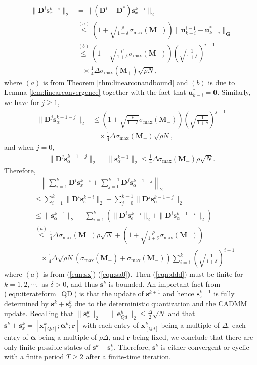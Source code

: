 \documentclass[journal]{IEEEtran}
\newcommand{\nn}{\nonumber}
\begin{document}
\begin{IEEEproof}
\begin{align}
\label{eqn:sx}
\|\bm D^i \bm s_x^{k-i}\|_2 &= \|(\bm D^{i} -\bm D^*)\bm s_x^{k-i}\|_2\nn\\
&\stackrel{(a)}{\leq}\left(1+\sqrt{\frac{\rho}{1+\delta}}\sigma_{\max}(\bm M_-)\right)\|\bm u_{k-i}^{i-1}-\bm u_{k-i}^*\|_{\bm G}\nn\\
&\stackrel{(b)}{\leq}\left(1+\sqrt{\frac{\rho}{1+\delta}}\sigma_{\max}(\bm M_-)\right) \left(\sqrt{\frac{1}{1+\delta}}\right)^{i-1}\nn\\&~~~~\times\frac{1}{4}\Delta\sigma_{\max}(\bm M_+)\sqrt{\rho N},
\end{align}
where $(a)$ is from Theorem \ref{thm:linearconandbound} and $(b)$ is due to Lemma \ref{lem:linearconvergence} together with the fact that $\bm u_{k-i}^*=\bm 0$. Similarly, we have for $j\geq 1$,
\begin{align}
\label{eqn:sa}
\|\bm D^j \bm s_\alpha^{k-1-j}\|_2 &\leq \left(1+\sqrt{\frac{\rho}{1+\delta}}\sigma_{\max}(\bm M_-)\right) \left(\sqrt{\frac{1}{1+\delta}}\right)^{j-1}\nn\\&~~~~\times\frac{1}{4}\Delta\sigma_{\max}(\bm M_-)\sqrt{{\rho}N},
\end{align}
and when $j=0$, 
\begin{align}
\label{eqn:sa0}
\|\bm D^j \bm s_\alpha^{k-1-j}\|_2=\|\bm s_\alpha^{k-1}\|_2\leq \frac{1}{4}\Delta\sigma_{\max}(\bm M_-)\rho\sqrt{N}.
\end{align} 
Therefore, 
\begin{align}
&~~~~\left\|\sum_{i=1}^{k} \bm D^i \bm s_x^{k-i}+\sum_{j=0}^{k-1} \bm D^j\bm s_\alpha^{k-1-j}\right\|_2\nn\\
&\leq \sum_{i=1}^{k} \|\bm D^i \bm s_e^{k-i}\|_2+\sum_{j=0}^{k-1} \|\bm D^j\bm s_\alpha^{k-1-j}\|_2\nn\\
&\leq \|\bm s_\alpha^{k-1}\|_2+\sum_{i=1}^{k}\left(\|\bm D^i \bm s_e^{k-i}\|_2+ \|\bm D^i\bm s_\alpha^{k-1-i}\|_2\right)\nn\\
&\stackrel{(a)}{\leq}\frac{1}{4}\Delta\sigma_{\max}(\bm M_-)\rho\sqrt{N}+\left(1+\sqrt{\frac{\rho}{1+\delta}}\sigma_{\max}(\bm M_-)\right)\nn\\       
&~~~~\times\frac{1}{4}\Delta\sqrt{\rho N}\left(\sigma_{\max}(\bm M_+)+\sigma_{\max}(\bm M_-)\right)\sum_{i=1}^{k}\left(\sqrt{\frac{1}{1+\delta}}\right)^{i-1}
\label{eqn:ddd}
\end{align}
where $(a)$ is from (\ref{eqn:sx})-(\ref{eqn:sa0}). Then (\ref{eqn:ddd}) must be finite for $k=1,2,\cdots,$ as $\delta >0$, and thus $\bm s^k$ is bounded. An important fact from (\ref{eqn:iterateform_QD}) is that the update of $\bm s^{k+1}$ and hence $\bm s_x^{k+1}$ is fully determined by $\bm s^k+\bm s_x^k$ due to the deterministic quantization and the CADMM update. Recalling that $\|\bm s_x^k\|_2 =\|\bm e_{Qd}^k\|_2\leq\frac{\Delta}{2}\sqrt{N}$ and that $\bm s^k+\bm s_x^k = [\bm x^k_{[Qd]};\bm\alpha^k;\bm r]$ with each entry of $\bm x^k_{[Qd]}$ being a multiple of $\Delta$, each entry of $\bm\alpha$ being a multiple of $\rho\Delta$, and $\bm r$ being fixed, we conclude that there are only finite possible states of $\bm s^k+\bm s_x^k$. Therefore, $\bm s^k$ is either convergent or cyclic with a finite period $T\geq 2$ after a finite-time iteration. 


\end{IEEEproof}
\end{document}
